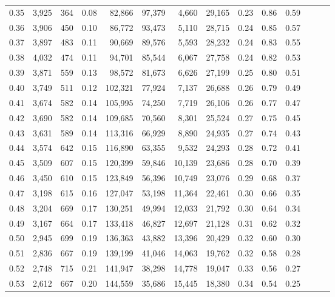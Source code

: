 \begin{tabular}{rrrrrrrrrrrrrr}
0.35 &  3,925 &  364 &  0.08 &   82,866 &   97,379 &   4,660 &  29,165 &  0.23 &  0.86 &      0.59 \\
0.36 &  3,906 &  450 &  0.10 &   86,772 &   93,473 &   5,110 &  28,715 &  0.24 &  0.85 &      0.57 \\
0.37 &  3,897 &  483 &  0.11 &   90,669 &   89,576 &   5,593 &  28,232 &  0.24 &  0.83 &      0.55 \\
0.38 &  4,032 &  474 &  0.11 &   94,701 &   85,544 &   6,067 &  27,758 &  0.24 &  0.82 &      0.53 \\
0.39 &  3,871 &  559 &  0.13 &   98,572 &   81,673 &   6,626 &  27,199 &  0.25 &  0.80 &      0.51 \\
0.40 &  3,749 &  511 &  0.12 &  102,321 &   77,924 &   7,137 &  26,688 &  0.26 &  0.79 &      0.49 \\
0.41 &  3,674 &  582 &  0.14 &  105,995 &   74,250 &   7,719 &  26,106 &  0.26 &  0.77 &      0.47 \\
0.42 &  3,690 &  582 &  0.14 &  109,685 &   70,560 &   8,301 &  25,524 &  0.27 &  0.75 &      0.45 \\
0.43 &  3,631 &  589 &  0.14 &  113,316 &   66,929 &   8,890 &  24,935 &  0.27 &  0.74 &      0.43 \\
0.44 &  3,574 &  642 &  0.15 &  116,890 &   63,355 &   9,532 &  24,293 &  0.28 &  0.72 &      0.41 \\
0.45 &  3,509 &  607 &  0.15 &  120,399 &   59,846 &  10,139 &  23,686 &  0.28 &  0.70 &      0.39 \\
0.46 &  3,450 &  610 &  0.15 &  123,849 &   56,396 &  10,749 &  23,076 &  0.29 &  0.68 &      0.37 \\
0.47 &  3,198 &  615 &  0.16 &  127,047 &   53,198 &  11,364 &  22,461 &  0.30 &  0.66 &      0.35 \\
0.48 &  3,204 &  669 &  0.17 &  130,251 &   49,994 &  12,033 &  21,792 &  0.30 &  0.64 &      0.34 \\
0.49 &  3,167 &  664 &  0.17 &  133,418 &   46,827 &  12,697 &  21,128 &  0.31 &  0.62 &      0.32 \\
0.50 &  2,945 &  699 &  0.19 &  136,363 &   43,882 &  13,396 &  20,429 &  0.32 &  0.60 &      0.30 \\
0.51 &  2,836 &  667 &  0.19 &  139,199 &   41,046 &  14,063 &  19,762 &  0.32 &  0.58 &      0.28 \\
0.52 &  2,748 &  715 &  0.21 &  141,947 &   38,298 &  14,778 &  19,047 &  0.33 &  0.56 &      0.27 \\
0.53 &  2,612 &  667 &  0.20 &  144,559 &   35,686 &  15,445 &  18,380 &  0.34 &  0.54 &      0.25 \\

\end{tabular}
